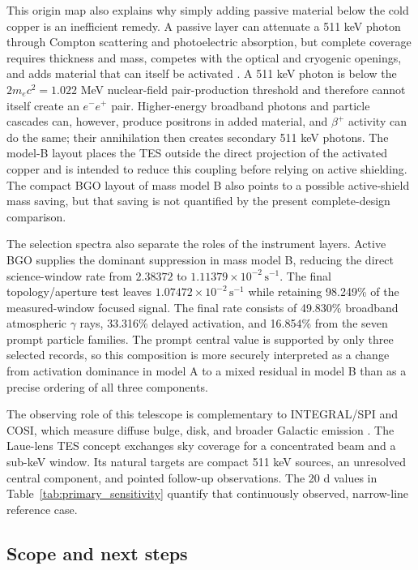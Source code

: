 \documentclass[11pt]{article}
\newcommand{\cps}{\ensuremath{\,\mathrm{s^{-1}}}}
\begin{document}
This origin map also explains why simply adding passive material below the cold
copper is an inefficient remedy. A passive layer can attenuate a 511 keV photon
through Compton scattering and photoelectric absorption, but complete coverage
requires thickness and mass, competes with the optical and cryogenic openings,
and adds material that can itself be activated \cite{NISTXCOM}. A 511 keV
photon is below the $2m_ec^2=1.022$ MeV nuclear-field pair-production
threshold and therefore cannot itself create an $e^-e^+$ pair. Higher-energy
broadband photons and particle cascades can, however, produce positrons in added
material, and $\beta^+$ activity can do the same; their annihilation then
creates secondary 511 keV photons. The model-B layout places the TES outside the
direct projection of the activated copper and is intended to reduce this coupling
before relying on active shielding. The compact BGO layout of mass model B also points
to a possible active-shield mass saving, but that saving is not quantified by
the present complete-design comparison.

The selection spectra also separate the roles of the instrument layers. Active
BGO supplies the dominant suppression in mass model B, reducing the direct
science-window rate from $2.38372$ to $1.11379\times10^{-2}\cps$. The final
topology/aperture test leaves $1.07472\times10^{-2}\cps$ while retaining
98.249\% of the measured-window focused signal. The final rate consists of
49.830\% broadband atmospheric $\gamma$ rays, 33.316\% delayed activation, and 16.854\%
from the seven prompt particle families. The prompt central value is supported
by only three selected records, so this composition is more securely interpreted
as a change from activation dominance in model A to a mixed residual in model B
than as a precise ordering of all three components.

The observing role of this telescope is complementary to INTEGRAL/SPI and COSI,
which measure diffuse bulge, disk, and broader Galactic emission
\cite{Siegert2016AA,Kierans2020,Siegert2020COSI,Yoneda2025,Karwin2023}. The
Laue-lens TES concept exchanges sky coverage for a concentrated beam and a
sub-keV window. Its natural targets are compact 511 keV sources, an unresolved
central component, and pointed follow-up observations. The 20 d values in
Table~\ref{tab:primary_sensitivity} quantify that continuously observed,
narrow-line reference case.

\subsection{Scope and next steps}
\label{subsec:limitations}
\end{document}
